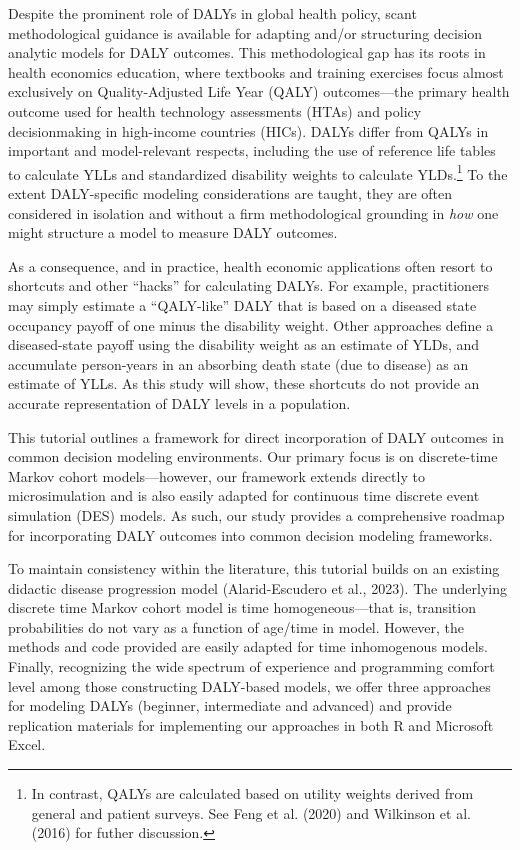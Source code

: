 \documentclass[
]{agujournal2019}
\begin{document}
Despite the prominent role of DALYs in global health policy, scant
methodological guidance is available for adapting and/or structuring
decision analytic models for DALY outcomes. This methodological gap has
its roots in health economics education, where textbooks and training
exercises focus almost exclusively on Quality-Adjusted Life Year (QALY)
outcomes---the primary health outcome used for health technology
assessments (HTAs) and policy decisionmaking in high-income countries
(HICs). DALYs differ from QALYs in important and model-relevant
respects, including the use of reference life tables to calculate YLLs
and standardized disability weights to calculate YLDs.\footnote{In
  contrast, QALYs are calculated based on utility weights derived from
  general and patient surveys. See Feng et al. (2020) and Wilkinson et
  al. (2016) for futher discussion.} To the extent DALY-specific
modeling considerations are taught, they are often considered in
isolation and without a firm methodological grounding in \emph{how} one
might structure a model to measure DALY outcomes.

As a consequence, and in practice, health economic applications often
resort to shortcuts and other ``hacks'' for calculating DALYs. For
example, practitioners may simply estimate a ``QALY-like'' DALY that is
based on a diseased state occupancy payoff of one minus the disability
weight. Other approaches define a diseased-state payoff using the
disability weight as an estimate of YLDs, and accumulate person-years in
an absorbing death state (due to disease) as an estimate of YLLs. As
this study will show, these shortcuts do not provide an accurate
representation of DALY levels in a population.

This tutorial outlines a framework for direct incorporation of DALY
outcomes in common decision modeling environments. Our primary focus is
on discrete-time Markov cohort models---however, our framework extends
directly to microsimulation and is also easily adapted for continuous
time discrete event simulation (DES) models. As such, our study provides
a comprehensive roadmap for incorporating DALY outcomes into common
decision modeling frameworks.

To maintain consistency within the literature, this tutorial builds on
an existing didactic disease progression model (Alarid-Escudero et al.,
2023). The underlying discrete time Markov cohort model is time
homogeneous---that is, transition probabilities do not vary as a
function of age/time in model. However, the methods and code provided
are easily adapted for time inhomogenous models. Finally, recognizing
the wide spectrum of experience and programming comfort level among
those constructing DALY-based models, we offer three approaches for
modeling DALYs (beginner, intermediate and advanced) and provide
replication materials for implementing our approaches in both R and
Microsoft Excel.
\end{document}
